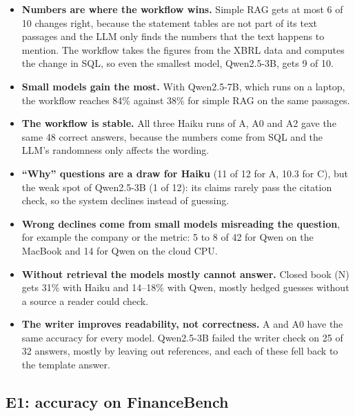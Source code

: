 \begin{itemize}
  \item \textbf{Numbers are where the workflow wins.} Simple RAG gets at most 6 of 10 changes right,
        because the statement tables are not part of its text passages and the LLM only finds the
        numbers that the text happens to mention. The workflow takes the figures from the XBRL data and
        computes the change in SQL, so even the smallest model, Qwen2.5-3B, gets 9 of 10.
  \item \textbf{Small models gain the most.} With Qwen2.5-7B, which runs on a laptop, the workflow
        reaches 84\% against 38\% for simple RAG on the same passages.
  \item \textbf{The workflow is stable.} All three Haiku runs of A, A0 and A2 gave the same 48 correct
        answers, because the numbers come from SQL and the LLM's randomness only affects the wording.
  \item \textbf{``Why'' questions are a draw for Haiku} (11 of 12 for A, 10.3 for C), but the weak spot
        of Qwen2.5-3B (1 of 12): its claims rarely pass the citation check, so the system declines
        instead of guessing.
  \item \textbf{Wrong declines come from small models misreading the question}, for example the
        company or the metric: 5 to 8 of 42 for Qwen on the MacBook and 14 for Qwen on the cloud CPU.
  \item \textbf{Without retrieval the models mostly cannot answer.} Closed book (N) gets 31\% with
        Haiku and 14--18\% with Qwen, mostly hedged guesses without a source a reader could check.
  \item \textbf{The writer improves readability, not correctness.} A and A0 have the same accuracy
        for every model. Qwen2.5-3B failed the writer check on 25 of 32 answers, mostly by leaving
        out references, and each of these fell back to the template answer.
\end{itemize}

\subsection{E1: accuracy on FinanceBench}

